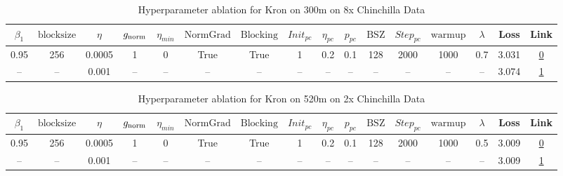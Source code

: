 \begin{table}[H]
\centering
\caption{Hyperparameter ablation for Kron on 300m on 8x Chinchilla Data}
\label{tab:ablation_kron_300m_on_8x_chinchilla_data}
\begin{tabular}{cccccccccccccccc}
\toprule
$\beta_1$ & $\mathrm{block size}$ & $\eta$ & $g_{\mathrm{norm}}$ & $\eta_{min}$ & $\mathrm{NormGrad}$ & $\mathrm{Blocking}$ & $Init_{pc}$ & $\eta_{pc}$ & $p_{pc}$ & $\mathrm{BSZ}$ & $Step_{pc}$ & $\mathrm{warmup}$ & $\lambda$ & Loss & Link \\
\midrule
0.95 & 256 & 0.0005 & 1 & 0 & True & True & 1 & 0.2 & 0.1 & 128 & 2000 & 1000 & 0.7 & 3.031 & \href{https://wandb.ai/marin-community/optimizer-scaling/runs/sweep-300m-48B-kronabb76feelr0.0005-wd0.7-b10.95-plr0.2-pis1-gn1-0ed5c4}{0} \\
\midrule
-- & -- & 0.001 & -- & -- & -- & -- & -- & -- & -- & -- & -- & -- & -- & 3.074 & \href{https://wandb.ai/marin-community/optimizer-scaling/runs/sweep-300m-48B-kronk1aa5b2lr0.001-wd0.7-b10.95-plr0.2-pis1-gn1-n-e34850}{1} \\
\bottomrule
\end{tabular}
\end{table}

\begin{table}[H]
\centering
\caption{Hyperparameter ablation for Kron on 520m on 2x Chinchilla Data}
\label{tab:ablation_kron_520m_on_2x_chinchilla_data}
\begin{tabular}{cccccccccccccccc}
\toprule
$\beta_1$ & $\mathrm{block size}$ & $\eta$ & $g_{\mathrm{norm}}$ & $\eta_{min}$ & $\mathrm{NormGrad}$ & $\mathrm{Blocking}$ & $Init_{pc}$ & $\eta_{pc}$ & $p_{pc}$ & $\mathrm{BSZ}$ & $Step_{pc}$ & $\mathrm{warmup}$ & $\lambda$ & Loss & Link \\
\midrule
0.95 & 256 & 0.0005 & 1 & 0 & True & True & 1 & 0.2 & 0.1 & 128 & 2000 & 1000 & 0.5 & 3.009 & \href{https://wandb.ai/marin-community/optimizer-scaling/runs/sweep-520m-21B-krona6b124lr0.0005-wd0.5-b10.95-plr0.2-pis1-gn1-n-6acf07}{0} \\
\midrule
-- & -- & 0.001 & -- & -- & -- & -- & -- & -- & -- & -- & -- & -- & -- & 3.009 & \href{https://wandb.ai/marin-community/optimizer-scaling/runs/sweep-520m-21B-kron680ae4lr0.001-wd0.5-b10.95-plr0.2-pis1-gn1-no-405d3d}{1} \\
\bottomrule
\end{tabular}
\end{table}

